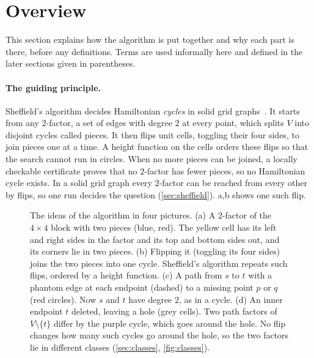 \documentclass[11pt]{article}
\theoremstyle{plain}
\theoremstyle{definition}
\theoremstyle{remark}
\begin{document}
\section{Overview}
\label{sec:overview}

This section explains how the algorithm is put together and why each part is there, before any
definitions.
Terms are used informally here and defined in the later sections given in parentheses.

\paragraph{The guiding principle.}
Sheffield's algorithm decides Hamiltonian \emph{cycles} in solid grid graphs~\cite{sheffield2000}.
It starts from any $2$-factor, a set of edges with degree $2$ at every point, which splits $V$ into
disjoint cycles called pieces.
It then flips unit cells, toggling their four sides, to join pieces one at a time.
A height function on the cells orders these flips so that the search cannot run in circles.
When no more pieces can be joined, a locally checkable certificate proves that no $2$-factor has
fewer pieces, so no Hamiltonian cycle exists.
In a solid grid graph every $2$-factor can be reached from every other by flips, so one run
decides the question (\cref{sec:sheffield}).
a,b shows one such flip.

\begin{figure}[t]
\centering

\caption{The ideas of the algorithm in four pictures.
(a) A $2$-factor of the $4\times4$ block with two pieces (blue, red).
The yellow cell has its left and right sides in the factor and its top and bottom sides out, and its
corners lie in two pieces.
(b) Flipping it (toggling its four sides) joins the two pieces into one cycle.
Sheffield's algorithm repeats such flips, ordered by a height function.
(c) A path from $s$ to $t$ with a phantom edge at each endpoint (dashed) to a missing point $p$ or
$q$ (red circles).
Now $s$ and $t$ have degree $2$, as in a cycle.
(d) An inner endpoint $t$ deleted, leaving a hole (grey cells).
Two path factors of $V\setminus\{t\}$ differ by the purple cycle, which goes around the hole.
No flip changes how many such cycles go around the hole, so the two factors lie in different
classes
(\cref{sec:classes}, \cref{fig:classes}).}
\label{fig:overview}
\end{figure}
\end{document}
